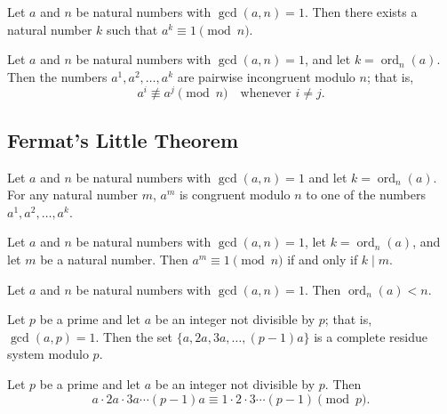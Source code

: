 \documentclass{article}
\theoremstyle{definition}
\newenvironment{manualtheorem}[1]{%
  \renewcommand{\thetheorem}{#1}%
  \theorem%
}{%
  \endtheorem%
}
\begin{document}
\begin{manualtheorem}{4.6}
	Let $a$ and $n$ be natural numbers with $\gcd(a,n) = 1$. Then there exists a natural number $k$ such that $a^{k} \equiv 1 \pmod{n}$.
\end{manualtheorem}

\begin{manualtheorem}{4.8}
	Let $a$ and $n$ be natural numbers with $\gcd(a,n) = 1$, and let
	$k = \operatorname{ord}_n(a)$. Then the numbers
	$a^1, a^2, \ldots, a^k$ are pairwise incongruent modulo $n$; that is,
	\[
		a^i \not\equiv a^j \pmod{n} \quad \text{whenever } i \neq j.
	\]
\end{manualtheorem}

\subsection{Fermat’s Little Theorem}

\begin{manualtheorem}{4.9}
	Let $a$ and $n$ be natural numbers with $\gcd(a,n) = 1$ and let $k = \operatorname{ord}_{n}(a)$. For any natural number $m$, $a^{m}$ is congruent modulo $n$ to one of the numbers $a^{1}, a^{2}, \ldots, a^{k}$.

\end{manualtheorem}

\begin{manualtheorem}{4.10}
	Let $a$ and $n$ be natural numbers with $\gcd(a,n) = 1$, let $k = \operatorname{ord}_{n}(a)$, and let $m$ be a natural number. Then $a^{m} \equiv 1 \pmod{n}$ if and only if $k \mid m$.
\end{manualtheorem}

\begin{manualtheorem}{4.11}
	Let $a$ and $n$ be natural numbers with $\gcd(a,n) = 1$. Then $\operatorname{ord}_{n}(a) < n$.
\end{manualtheorem}

\begin{manualtheorem}{4.13}
	Let $p$ be a prime and let $a$ be an integer not divisible by $p$; that is, $\gcd(a,p) = 1$. Then the set $\{a, 2a, 3a, \ldots, (p-1)a\}$ is a complete residue system modulo $p$.

\end{manualtheorem}

\begin{manualtheorem}{4.14}
	Let $p$ be a prime and let $a$ be an integer not divisible by $p$. Then
	\[
		a \cdot 2a \cdot 3a \cdots (p-1)a \equiv 1 \cdot 2 \cdot 3 \cdots (p-1) \pmod{p}.
	\]
\end{manualtheorem}
\end{document}
